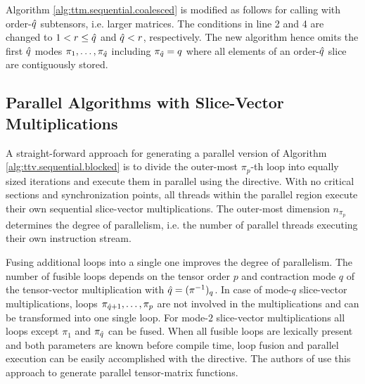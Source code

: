 Algorithm \ref{alg:ttm.sequential.coalesced} is modified as follows for calling  with order-$\hat{q}$ subtensors, i.e. larger matrices. 
The conditions in line 2 and 4 are changed to $1 < r \leq \hat{q}$ and $\hat{q} < r$, respectively.
The new algorithm hence omits the first $\hat{q}$ modes $\pi_1, \dots, \pi_{\hat{q}}$ including $\pi_{\hat{q}} = q$ where all elements of an order-$\hat{q}$ slice are contiguously stored.
 
\subsection{Parallel Algorithms with Slice-Vector Multiplications}
\label{subsec:parallel.multi-loops}
A straight-forward approach for generating a parallel version of Algorithm \ref{alg:ttv.sequential.blocked} is to divide the outer-most $\pi_p$-th loop into equally sized iterations and execute them in parallel using the    directive\cite{bassoy:2018:fast}.
With no critical sections and synchronization points, all threads within the parallel region execute their own sequential slice-vector multiplications.
The outer-most dimension $n_{\pi_p}$ determines the degree of parallelism, i.e. the number of parallel threads executing their own instruction stream.


Fusing additional loops into a single one improves the degree of parallelism.
The number of fusible loops depends on the tensor order $p$ and contraction mode $q$ of the tensor-vector multiplication with $\hat{q} = (\pi^{-1})_q$.
In case of mode-$q$ slice-vector multiplications, loops $\pi_{\hat{q}+1}, \dots, \pi_{p}$ are not involved in the multiplications and can be transformed into one single loop.
For mode-$2$ slice-vector multiplications all loops except $\pi_1$ and $\pi_{\hat{q}}$ can be fused.
When all fusible loops are lexically present and both parameters are known before compile time, loop fusion and parallel execution can be easily accomplished with the   directive.
The authors of \cite{li:2015:input} use this approach to generate parallel tensor-matrix functions.


